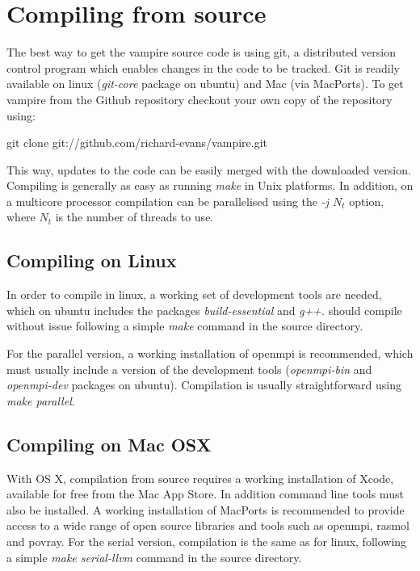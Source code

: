 \section*{Compiling from source}
The best way to get the vampire source code is using git, a distributed version control program which enables changes in the code to be tracked. Git is readily available on linux (\textit{git-core} package on ubuntu) and Mac (via MacPorts). To get vampire from the Github repository checkout your own copy of the repository using:

\noindent
\begin{minipage}[c]{\textwidth}
\centering
git clone git://github.com/richard-evans/vampire.git
\end{minipage}

This way, updates to the code can be easily merged with the downloaded version. Compiling is generally as easy as running \textit{make} in Unix platforms. In addition, on a multicore processor compilation can be parallelised using the \textit{-j $N_t$} option, where $N_t$ is the number of threads to use.

\subsection*{Compiling on Linux}
In order to compile in linux, a working set of development tools are needed, which on ubuntu includes the packages \textit{build-essential} and \textit{g++}. 
\vampire should compile without issue following a simple \textit{make} command in the source directory.

For the parallel version, a working installation of openmpi is recommended, which must usually include a version of the development tools (\textit{openmpi-bin} and \textit{openmpi-dev} packages on ubuntu). Compilation is usually straightforward using \textit{make parallel}.

\subsection*{Compiling on Mac OSX}
 With OS X, compilation from source requires a working installation of Xcode, available for free from the Mac App Store. In addition command line tools must also be installed. A working installation of MacPorts is recommended to provide access to a wide range of open source libraries and tools such as openmpi, rasmol and povray. For the serial version, compilation is the same as for linux, following a simple \textit{make serial-llvm} command in the source directory.


